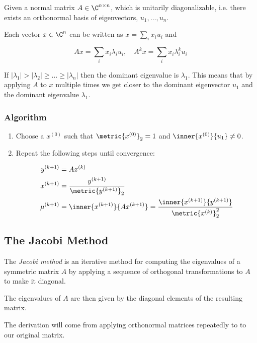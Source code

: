 Given a normal matrix \(A \in \C^{n \times n}\), which is unitarily diagonalizable, i.e. there exists an orthonormal basis of 
eigenvectors, \(u_1, \dots, u_n\).

Each vector \(x \in \C^n\) can be written as \(x = \sum_i x_i u_i\) and 

\[
    Ax = \sum_i x_i \lambda_i u_i, \quad A^k x = \sum_i x_i \lambda_i^k u_i
\]

If \(|\lambda_1| > |\lambda_2| \ge \dots \ge |\lambda_n|\) then the dominant eigenvalue is \(\lambda_1\). This 
means that by applying \(A\) to \(x\) multiple times we get closer to the dominant eigenvector \(u_1\) and the dominant eigenvalue \(\lambda_1\).

\subsubsection*{Algorithm}

\begin{enumerate}
    
    \item Choose a \(x^{(0)}\) such that \(\metric{x^{(0)}}_2 = 1\) and \(\inner{x^{(0)}}{u_1} \neq 0\).

    \item Repeat the following steps until convergence: 
    
    \begin{align*}
        y^{(k + 1)} &= Ax^{(k)} \\
        x^{(k + 1)} &= \frac{y^{(k + 1)}}{\metric{y^{(k + 1)}}_2} \\ 
        \mu^{(k + 1)} &= \inner{x^{(k + 1)}}{Ax^{(k + 1)}} = \frac{\inner{x^{(k + 1)}}{y^{(k + 1)}}}{\metric{x^{(k)}}_2^2}
    \end{align*}

\end{enumerate}

\subsection{The Jacobi Method}

The \emph{Jacobi method} is an iterative method for computing the eigenvalues of a symmetric matrix \(A\) by applying a sequence 
of orthogonal transformations to \(A\) to make it diagonal. 

The eigenvalues of \(A\) are then given by the diagonal elements of the resulting matrix.

The derivation will come from applying orthonormal matrices repeatedly to to our original matrix. 

